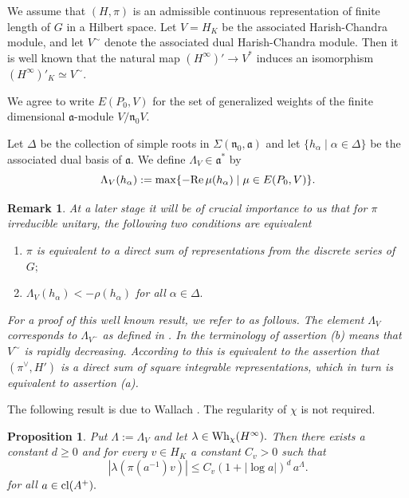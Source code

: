 \documentclass[12pt,a4paper]{article}
\newtheorem{Prop}[Thm]{Proposition}
\newtheorem{Rem}[Thm]{Remark}
\newenvironment{prop}[0]{\begin{Prop}\noindent}%
{\end{Prop}}
\newenvironment{rem}[0]{\begin{Rem}\noindent\rm}%
{\end{Rem}}
\def\itema{\vspace{-1mm}\item[{\rm (a)}]}
\def\itemb{\item[{\rm (b)}]}
\def\ga{\alpha}
\def\gl{\lambda}
\def\gD{\Delta}
\def\gS{\Sigma}
\def\got#1{\mathfrak #1}
\def\fa{{\got a}}
\def\fn{{\got n}}
\def\to{\rightarrow}
\def\Re{{\rm Re}\,}
\numberwithin{Thm}{section}
\numberwithin{equation}{section}
\def\Wh{{\rm Wh}}
\def\gL{\Lambda}
\numberwithin{equation}{section}
\def\fad{{\fa^*}}
\def\cl{{\rm cl}}
\def\gL{\Lambda}
\def\cchi{\chi}
\def\veec{\vee}%
\begin{document}
We assume that $(H, \pi)$ is an admissible continuous representation 
of finite length of $G$ in a Hilbert space. Let $V = H_K$ be the associated Harish-Chandra module, and let $V^\sim$ denote  the associated dual Harish-Chandra module.
Then it is well known that the natural map $(H^\infty)'  \to V^*$ induces an isomorphism 
$(H^\infty)'_K \simeq V^\sim.$ 

We agree to write $E(P_0, V )$ for the set of generalized weights of the 
finite dimensional $\fa$-module $V/\fn_0 V.$ 

Let $\gD$ be the collection of simple roots in $\gS(\fn_0, \fa)$ and let  
$\{h_\ga \mid \ga\in \gD\}$ be the associated dual basis of $\fa.$ 
We define $\gL_V \in \fad$ by 
\begin{equation}
\label{e: defi gL V}
\gL_V(h_\ga) := \max\{- \Re \mu (h_\ga) \mid \mu \in E(P_0, V)\}.
\end{equation} 

\begin{rem}
\label{r: ds and gL}
At a later stage it will be of crucial importance to us that for  $\pi$ irreducible unitary, the following two conditions are equivalent
\begin{enumerate}
\itema $\pi$ is equivalent to a direct sum of representations from the discrete series of $G;$ 
\itemb $\gL_V(h_\ga) < -\rho(h_\ga)$ for all $\ga \in \gD.$ 
\end{enumerate}
For a proof of this well known result, we refer to \cite{Wrrg1} as follows.
The element $\gL_V$ corresponds to $\gL_{V^\sim}$ 
as defined in \cite[\S 4.3.5]{Wrrg1}. In the terminology of \cite[\S 5.1.1]{Wrrg1} assertion 
(b) means that $V^\sim$ is rapidly decreasing. According to \cite[Prop.\ 5.1.3 \&\ Thm. 5.5.4]{Wrrg1} 
this is equivalent to the assertion that $(\pi^\veec, H')$ is a direct sum of square integrable
representations, which in turn is equivalent to assertion (a).
\end{rem}

The following result is due to  Wallach \cite[15.2.2]{Wrrg2}. The regularity
of $\chi$ is not required.

\begin{prop}
\label{p: first estimate whittaker coefficient}
Put $\gL:= \gL_V$ and let $\gl \in \Wh_\cchi(H^\infty).$ 
Then there exists a constant $d \geq 0$ 
and for every $v \in H_K$ a constant $C_v > 0$ such that 
$$ 
|\gl(\pi(a^{-1}) v) |\leq C_v ( 1+ |\log a|)^d \,a^\gL.
$$%
for all $a \in \cl(A^+).$ 
\end{prop}
\end{document}

